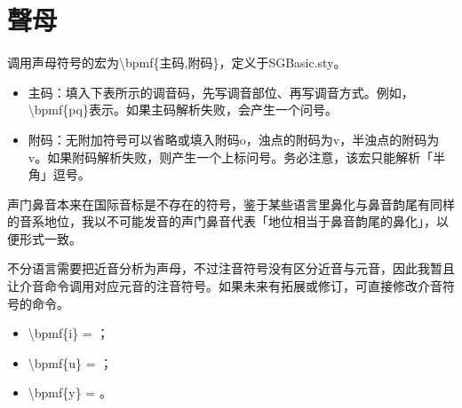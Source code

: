 \section{聲母}
调用声母符号的宏为{\textbackslash}bpmf\{主码,附码\}，定义于SGBasic.sty。\par
\begin{itemize}
	\item 主码：填入下表所示的调音码，先写调音部位、再写调音方式。例如，{\textbackslash}bpmf\{pq\}表示。如果主码解析失败，会产生一个问号。
	\item 附码：无附加符号可以省略或填入附码o，浊点的附码为v，半浊点的附码为v。如果附码解析失败，则产生一个上标问号。务必注意，该宏只能解析「半角」逗号。
\end{itemize}
声门鼻音本来在国际音标是不存在的符号，鉴于某些语言里鼻化与鼻音韵尾有同样的音系地位，我以不可能发音的声门鼻音代表「地位相当于鼻音韵尾的鼻化」，以便形式一致。\par
{}
不分语言需要把近音分析为声母，不过注音符号没有区分近音与元音，因此我暂且让介音命令调用对应元音的注音符号。如果未来有拓展或修订，可直接修改介音符号的命令。\par
\begin{itemize}
	\item {\textbackslash}bpmf\{i\} = ；
	\item {\textbackslash}bpmf\{u\} = ；
	\item {\textbackslash}bpmf\{y\} = 。
\end{itemize}

\clearpage
